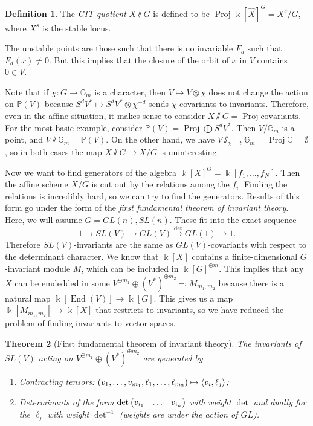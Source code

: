 \documentclass[leqno, openany]{memoir}
\newtheorem{thm}{Theorem}[section]
\theoremstyle{definition}
\newtheorem{defn}[thm]{Definition}
\theoremstyle{remark}
\theoremstyle{plain}
\theoremstyle{definition}
\theoremstyle{remark}
\newcommand{\C}{\mathbb{C}}
\newcommand{\G}{\mathbb{G}}
\renewcommand{\k}{\Bbbk}
\renewcommand{\P}{\mathbb{P}}
\newcommand{\wh}[1]{\widehat{#1}}
\DeclareMathOperator{\End}{End}
\DeclareMathOperator{\Proj}{Proj}
\begin{document}
\begin{defn} The \textit{GIT quotient} $X \sslash G$ is defined to be $\Proj
{\k[\wh{X}]}^G = X^s/G$, where $X^s$ is the stable locus.  \end{defn}

The unstable points are those such that there is no invariable $F_d$ such that
$F_d(x) \neq 0$. But this implies that the closure of the orbit of $x$ in $V$
contains $0 \in V$.

Note that if $\chi \colon G \to \mathbb{G}_m$ is a character, then $V \mapsto V
\otimes \chi$ does not change the action on $\P(V)$ because $S^d V^* \mapsto
S^d V^* \otimes \chi^{-d}$ sends $\chi$-covariants to invariants. Therefore,
even in the affine situation, it makes sense to consider $X \sslash G = \Proj
\text{covariants}$. For the most basic example, consider $\P(V) = \Proj
\bigoplus S^d V^*$. Then $V/\G_m$ is a point, and $V \sslash \G_m = \P(V)$. On
the other hand, we have $V \sslash_{\chi = t} \G_m = \Proj \C = \emptyset$, so
in both cases the map $X \sslash G \to X/G$ is uninteresting.

Now we want to find generators of the algebra ${\k[X]}^G = \k[f_1, \ldots,
f_N]$. Then the affine scheme $X/G$ is cut out by the relations among the
$f_i$. Finding the relations is incredibly hard, so we can try to find the
generators. Results of this form go under the form of the \textit{first
fundamental theorem of invariant theory}. Here, we will assume $G = GL(n),
SL(n)$. These fit into the exact sequence \[ 1 \to SL(V) \to GL(V)
\xrightarrow{\det} GL(1) \to 1. \] Therefore $SL(V)$-invariants are the same as
$GL(V)$-covariants with respect to the determinant character. We know that
$\k[X]$ contains a finite-dimensional $G$-invariant module $M$, which can be
included in ${\k[G]}^{\oplus m}$. This implies that any $X$ can be emdedded in
some $V^{\oplus m_1} \oplus {(V^*)}^{\oplus m_2} \eqqcolon M_{m_1, m_2}$
because there is a natural map $\k[\End(V)] \to \k[G]$. This gives us a map
$\k[M_{m_1, m_2}] \to \k[X]$ that restricts to invariants, so we have reduced
the problem of finding invariants to vector spaces.

\begin{thm}[First fundamental theorem of invariant theory] The invariants of
    $SL(V)$ acting on $V^{\oplus m_1} \oplus {(V^*)}^{\oplus m_2}$ are
    generated by \begin{enumerate} \item Contracting tensors: $(v_1, \ldots,
        v_{m_1}, \ell_1, \ldots, \ell_{m_2}) \mapsto \ev{v_i, \ell_j}$; \item
        Determinants of the form $\det \mqty(v_{i_1} & \ldots & v_{i_n})$ with
        weight $\det$ and dually for the $\ell_{j}$ with weight $\det^{-1}$
        (weights are under the action of $GL$).  \end{enumerate} \end{thm}
\end{document}
